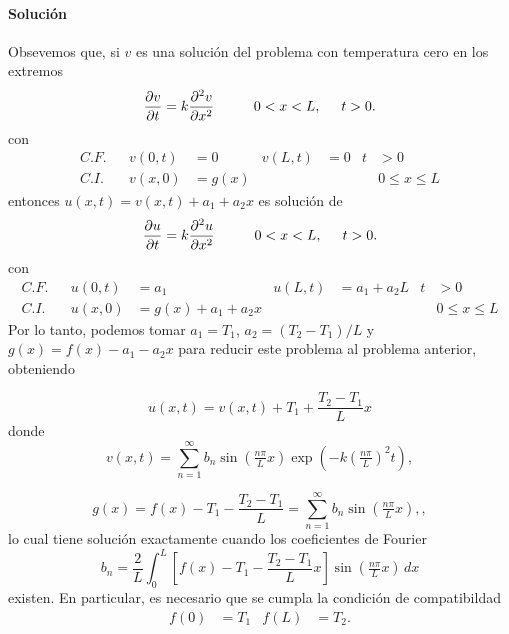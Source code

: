 \documentclass[11pt,letterpaper,draft]{report}
\newcommand\<{\langle}
\renewcommand\>{\rangle}
\begin{document}
\paragraph{Solución}
Obsevemos que, si $v$ es una solución del problema con
temperatura cero en los extremos
\[
  \frac{\partial v}{\partial t}
  = k
  \frac{\partial ^2 v}{\partial x^2}
  \hspace{10mm} 0<x<L,
  \hspace{5mm} t>0.
\]
con
\begin{align*}
  C.F. && v(0,t) &= 0 & v(L,t) &= 0 &t&>0 \\
  C.I. && v(x,0) &= g(x) & &&& 0\leq x\leq L
\end{align*}
entonces $u(x,t)=v(x,t)+a_1+a_2x$ es solución de
\[
  \frac{\partial u}{\partial t}
  = k
  \frac{\partial ^2 u}{\partial x^2}
  \hspace{10mm} 0<x<L,
  \hspace{5mm} t>0.
\]
con
\begin{align*}
  C.F. && u(0,t) &= a_1 & u(L,t) &= a_1+a_2L &t&>0 \\
  C.I. && u(x,0) &= g(x)+a_1+a_2x & &&& 0\leq x\leq L
\end{align*}
Por lo tanto, podemos tomar $a_1=T_1$, $a_2=(T_2-T_1)/L$ y
$g(x)=f(x)-a_1-a_2x$ para reducir este problema al problema
anterior, obteniendo

\[
  u(x,t) = v(x,t) + T_1 + \frac{T_2-T_1}{L}x
\]
donde
\begin{equation}
  v(x,t)
  = \sum_{n=1}^{\infty}
  b_n\sin(\tfrac{n\pi}{L}x)\exp(-k(\tfrac{n\pi}{L})^2t),
\end{equation}

\[
  g(x)
  = f(x)-T_1-\frac{T_2-T_1}{L}
  = \sum_{n=1}^{\infty}
  b_n\sin(\tfrac{n\pi}{L}x),
,\]
lo cual tiene solución exactamente cuando los coeficientes de
Fourier
\[
  b_n = \frac{2}{L}\int_0^L
    \left[f(x) - T_1 - \frac{T_2-T_1}{L}x\right]
    \sin(\tfrac{n\pi}{L}x)\,dx
\]
existen. En particular, es necesario que se cumpla
la condición de compatibildad
\begin{align*}
  f(0) &= T_1 & f(L) &= T_2.
\end{align*}
\end{document}
